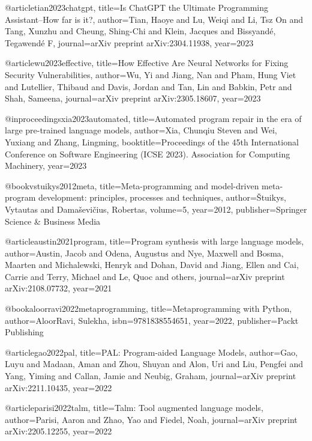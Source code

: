 @article{tian2023chatgpt,
  title={Is ChatGPT the Ultimate Programming Assistant--How far is it?},
  author={Tian, Haoye and Lu, Weiqi and Li, Tsz On and Tang, Xunzhu and Cheung, Shing-Chi and Klein, Jacques and Bissyand{\'e}, Tegawend{\'e} F},
  journal={arXiv preprint arXiv:2304.11938},
  year={2023}
}

@article{wu2023effective,
  title={How Effective Are Neural Networks for Fixing Security Vulnerabilities},
  author={Wu, Yi and Jiang, Nan and Pham, Hung Viet and Lutellier, Thibaud and Davis, Jordan and Tan, Lin and Babkin, Petr and Shah, Sameena},
  journal={arXiv preprint arXiv:2305.18607},
  year={2023}
}

@inproceedings{xia2023automated,
  title={Automated program repair in the era of large pre-trained language models},
  author={Xia, Chunqiu Steven and Wei, Yuxiang and Zhang, Lingming},
  booktitle={Proceedings of the 45th International Conference on Software Engineering (ICSE 2023). Association for Computing Machinery},
  year={2023}
}




@book{vstuikys2012meta,
  title={Meta-programming and model-driven meta-program development: principles, processes and techniques},
  author={{\v{S}}tuikys, Vytautas and Dama{\v{s}}evi{\v{c}}ius, Robertas},
  volume={5},
  year={2012},
  publisher={Springer Science \& Business Media}
}

@article{austin2021program,
  title={Program synthesis with large language models},
  author={Austin, Jacob and Odena, Augustus and Nye, Maxwell and Bosma, Maarten and Michalewski, Henryk and Dohan, David and Jiang, Ellen and Cai, Carrie and Terry, Michael and Le, Quoc and others},
  journal={arXiv preprint arXiv:2108.07732},
  year={2021}
}

@book{aloorravi2022metaprogramming,
  title={Metaprogramming with Python},
  author={AloorRavi, Sulekha},
  isbn={9781838554651},
  year={2022},
  publisher={Packt Publishing}
}

@article{gao2022pal,
  title={PAL: Program-aided Language Models},
  author={Gao, Luyu and Madaan, Aman and Zhou, Shuyan and Alon, Uri and Liu, Pengfei and Yang, Yiming and Callan, Jamie and Neubig, Graham},
  journal={arXiv preprint arXiv:2211.10435},
  year={2022}
}

@article{parisi2022talm,
  title={Talm: Tool augmented language models},
  author={Parisi, Aaron and Zhao, Yao and Fiedel, Noah},
  journal={arXiv preprint arXiv:2205.12255},
  year={2022}
}

